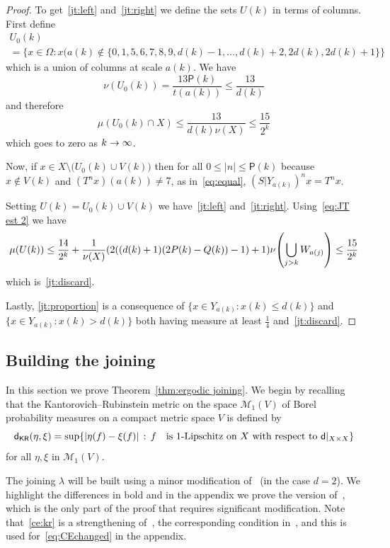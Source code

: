 \documentclass[10pt]{amsart}
\theoremstyle{definition}\newtheorem{defi}[theo]{Definition}\newtheorem{rema}[theo]{Remark}\newtheorem{exam}[theo]{Example}\newtheorem{exem}[theo]{Example}\newtheorem{nota}[theo]{Notation}
\newcommand{\metric}{\mathsf{d}}
\newcommand{\KR}{\mathsf{KR}}
\renewcommand{\P}{\mathsf{P}}
\newcommand{\meas}{\mathcal{M}}
\let\originalleft\left
\let\originalright\right
\renewcommand{\left}{\mathopen{}\mathclose\bgroup\originalleft}
\renewcommand{\right}{\aftergroup\egroup\originalright}
\renewcommand*{\to}{\mathchoice{\longrightarrow}{\rightarrow}{\rightarrow}{\rightarrow}}
\newcommand*{\MK}{\mkern 2mu}
\begin{document}
\begin{proof}
To get~\eqref{jt:left} and~\eqref{jt:right} we define the sets $U(k)$ in terms of columns. First define
\begin{multline}\label{eq:U}
U_0(k)\\
=\bigl\{x\in \Omega:x(a(k)\notin \{0,1,5,6,7,8,9,d(k)-1,\dots,d(k)+2,2d(k),2d(k)+1\}\bigr\}
\end{multline}
which is a union of columns at scale $a(k)$. We have
\[
\nu(U_0(k)) = \frac{13 \P(k)}{t(a(k))} \le \frac{13}{d(k)}
\]
and therefore
\begin{equation}\label{eq:JT est 2}
\mu(U_0(k) \cap X) \le \frac{13}{d(k) \nu(X)} \le \frac{15}{2^k}
\end{equation}
which goes to zero as $k \to \infty$.


Now, if
$
x \in X \setminus \bigl(U_0(k) \cup V(k)\bigr)
$
then for all $0\leq |n|\leq \P(k)$ because $x \notin V(k)$ and $(T^nx)(a(k))\neq 7$, as in~\eqref{eq:equal}, $(S|Y_{a(k)})^nx=T^nx$.

Setting $U(k)=U_0(k) \cup V(k)$ we have~\eqref{jt:left} and~\eqref{jt:right}. Using~\eqref{eq:JT est 2} we have
\[
\mu(U(k))
\leq
\frac{14}{2^k}
+
\frac 1 {\nu(X)}
(2( (d(k) + 1) (2P(k) - Q(k)) - 1) + 1)
\nu\left(\bigcup_{j>k}W_{a(j)}\right)\leq \frac {15} {2^k}
\]
which is~\eqref{jt:discard}.

Lastly, \eqref{jt:proportion} is a consequence of $\{ x \in Y_{a(k)} : x(k) \le d(k) \}$ and $\{x \in Y_{a(k)} : x(k) > d(k) \}$ both having measure at least $\frac{1}{4}$ and~\eqref{jt:discard}.
\end{proof}


\subsection{Building the joining}\label{subsec:apply_CE}

In this section we prove Theorem~\ref{thm:ergodic joining}. We begin by recalling that the Kantorovich--Rubinstein metric on the space $\meas_1(V)$ of Borel probability measures on a compact metric space $V$ is defined by
\[
\metric_\KR(\eta,\xi) = \sup \left\{ | \eta(f) - \xi(f) | \,:\, f \quad\text{is 1-Lipschitz on $X$ with respect to } \metric|_{X\times X} \right\}
\]
for all $\eta, \xi$ in $\meas_1(V)$.



The joining $\lambda$ will be built using a minor modification of~\cite[Proposition~3.1]{MR4269425} (in the case $d=2$). We highlight the differences in bold and in the appendix we prove the version of~\cite[Corollary~3.3]{MR4269425}, which is the only part of the proof that requires significant modification. Note that~\eqref{ce:kr} is a strengthening of~\cite[Proposition~3.1$\MK$(B)]{MR4269425}, the corresponding condition in~\cite{MR4269425}, and this is used for~\eqref{eq:CEchanged} in the appendix.
\end{document}
